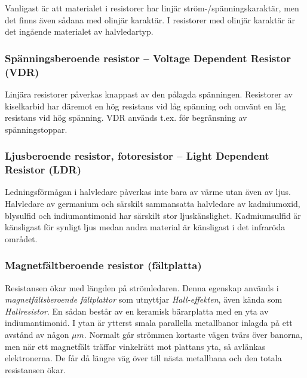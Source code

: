 Vanligast är att materialet i resistorer har linjär ström-/spänningskaraktär,
men det finns även sådana med olinjär karaktär. I resistorer med olinjär
karaktär är det ingående materialet av halvledartyp.

\subsubsection{Spänningsberoende resistor -- Voltage Dependent Resistor (VDR)}

Linjära resistorer påverkas knappast av den pålagda spänningen. Resistorer av
kiselkarbid har däremot en hög resistans vid låg spänning och omvänt en låg
resistans vid hög spänning. VDR används t.ex. för begränsning av
spänningstoppar.

\subsubsection{Ljusberoende resistor, fotoresistor -- Light Dependent Resistor (LDR)}

Ledningsförmågan i halvledare påverkas inte bara av värme utan även av ljus.
Halvledare av germanium och särskilt sammansatta halvledare av kadmiumoxid,
blysulfid och indiumantimonid har särskilt stor ljuskänslighet. Kadmiumsulfid
är känsligast för synligt ljus medan andra material är känsligast i det
infraröda området.

\subsubsection{Magnetfältberoende resistor (fältplatta)}

Resistansen ökar med längden på strömledaren. Denna egenskap används i
\emph{magnetfältsberoende fältplattor} som utnyttjar \emph{Hall-effekten}, även
kända som \emph{Hallresistor}. En sådan består av en keramisk bärarplatta med
en yta av indiumantimonid. I ytan är ytterst smala parallella metallbanor
inlagda på ett avstånd av någon \(\mu m\). Normalt går strömmen kortaste vägen
tvärs över banorna, men när ett magnetfält träffar vinkelrätt mot plattans yta,
så avlänkas elektronerna. De får då längre väg över till nästa metallbana och
den totala resistansen ökar.

